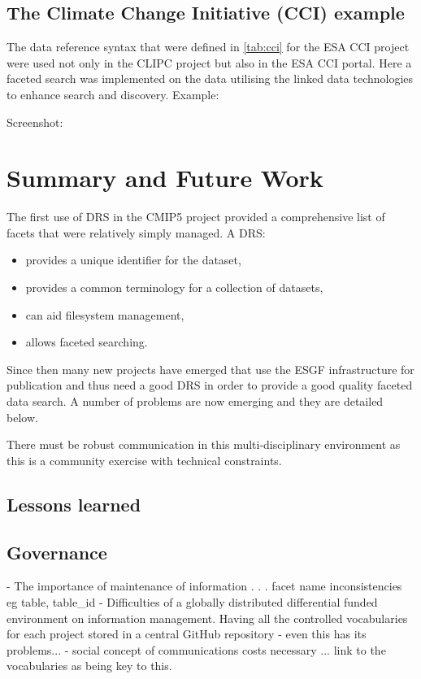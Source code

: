 \documentclass[final,1p,times,twocolumn,authoryear]{elsarticle}
\begin{document}
{{\subsection{The Climate Change Initiative (CCI) example}

The data reference syntax that were defined in \ref{tab:cci} for the ESA CCI project were used not only in the CLIPC project but also in the ESA CCI portal. 
Here a faceted search was implemented on the data utilising the linked data technologies to enhance search and discovery. 
Example:

Screenshot:









\section{Summary and Future Work}

The first use of DRS in the CMIP5 project provided a comprehensive list of facets that were relatively simply managed. A DRS:

\begin{itemize}
\item provides a unique identifier for the dataset,
\item provides a common terminology for a collection of datasets,
\item can aid filesystem management,
\item allows faceted searching.
\end{itemize}

Since then many new projects have emerged that use the ESGF infrastructure for publication and thus need a good DRS in order to provide a good quality faceted data search. A number of problems are now emerging and they are detailed below. 

There must be robust communication in this multi-disciplinary environment as this is a community exercise with technical constraints. 

\subsection{Lessons learned}
\subsection{Governance}
- The importance of maintenance of information . . . facet name inconsistencies eg table, table\_id 
- Difficulties of a globally distributed differential funded environment on information management. Having all the controlled vocabularies for each project stored in a central GitHub repository - even this has its problems...
- social concept of communications costs necessary ... link to the vocabularies as being key to this.
}}
\end{document}
